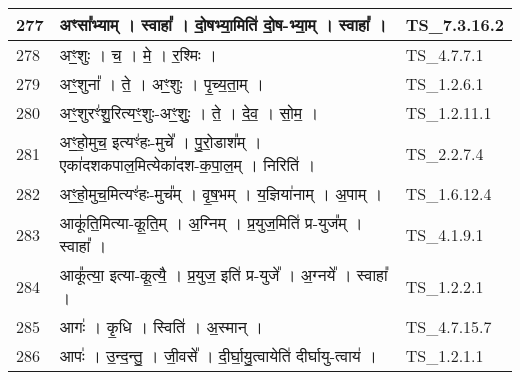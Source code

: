 \documentclass[17pt]{extarticle}
\begin{document}
\begin{longtable}{||p{0.4in}||p{4.9in}||p{0.9in}||}
    \hline
        
    277 & अꣳसा᳚भ्याम्   ।   स्वाहा᳚   ।   दो॒षभ्या॒मिति॑ दो॒ष{-}भ्या॒म्   ।   स्वाहा᳚   ।    & TS\_7.3.16.2       \\
    
    \hline
        
    278 & अꣳ॒॒शुः   ।   च॒   ।   मे॒   ।   र॒श्मिः   ।    & TS\_4.7.7.1       \\
    
    \hline
        
    279 & अꣳ॒॒शुना᳚   ।   ते॒   ।   अꣳ॒॒शुः   ।   पृ॒च्य॒ता॒म्   ।    & TS\_1.2.6.1       \\
    
    \hline
        
    280 & अꣳ॒॒शुरꣳ॑शु॒रित्यꣳ॒॒शुः{-}अꣳ॒॒शुः॒   ।   ते॒   ।   दे॒व॒   ।   सो॒म॒   ।    & TS\_1.2.11.1       \\
    
    \hline
        
    281 & अꣳ॒॒हो॒मुच॒ इत्यꣳ॑हः{-}मुचे᳚   ।   पु॒रो॒डाश᳚म्   ।   एका॑दशकपाल॒मित्येका॑दश{-}क॒पा॒ल॒म्   ।   निरिति॑   ।    & TS\_2.2.7.4       \\
    
    \hline
        
    282 & अꣳ॒॒हो॒मुच॒मित्यꣳ॑हः{-}मुच᳚म्   ।   वृ॒ष॒भम्   ।   य॒ज्ञिया॑नाम्   ।   अ॒पाम्   ।    & TS\_1.6.12.4       \\
    
    \hline
        
    283 & आकू॑ति॒मित्या{-}कू॒ति॒म्   ।   अ॒ग्निम्   ।   प्र॒युज॒मिति॑ प्र{-}युज᳚म्   ।   स्वाहा᳚   ।    & TS\_4.1.9.1       \\
    
    \hline
        
    284 & आकू᳚त्या॒ इत्या{-}कू॒त्यै॒   ।   प्र॒युज॒ इति॑ प्र{-}युजे᳚   ।   अ॒ग्नये᳚   ।   स्वाहा᳚   ।    & TS\_1.2.2.1       \\
    
    \hline
        
    285 & आगः॑   ।   कृ॒धि   ।   स्विति॑   ।   अ॒स्मान्   ।    & TS\_4.7.15.7       \\
    
    \hline
        
    286 & आपः॑   ।   उ॒न्द॒न्तु॒   ।   जी॒वसे᳚   ।   दी॒र्घा॒यु॒त्वायेति॑ दीर्घायु{-}त्वाय॑   ।    & TS\_1.2.1.1       \\
    
    \hline
        

\end{longtable}
\end{document}
